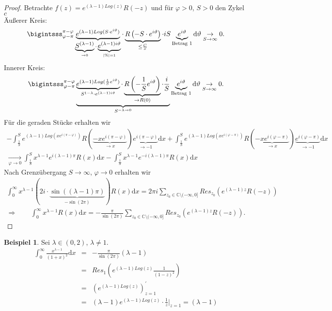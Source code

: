\documentclass[11pt,titlepage]{article}
\theoremstyle{definition}
\newtheorem{example}[theorem]{Beispiel}
\theoremstyle{remark}
\begin{document}
	\begin{proof}
		Betrachte $f(z)=e^{(\lambda -1)Log(z)}R(-z)$ und für $\varphi >0$, $S>0$ den Zykel $c$ \\
		
		
		Äußerer Kreis:
		\[ \bigintsss_{\varphi-\pi}^{\pi-\varphi}\underbrace{e^{(\lambda -1)Log(S\cdot e^{i\vartheta})}}_
		{\underbrace{S^{(\lambda -1)}}_{\to 0} \cdot \underbrace{ e^{(\lambda -1)i\vartheta}}_{|\%|=1}}
		\cdot \underbrace{ R\left( -S\cdot e^{i\vartheta}\right)}_{\leq \frac{C}{S}}\cdot 
		iS\underbrace{e^{i\vartheta}}_
		{\text{Betrag $1$}}\mathrm{d}\vartheta \underset{S\to\infty}{\to}0.\]
		Innerer Kreis:
		\[ \bigintsss_{\varphi-\pi}^{\pi-\varphi} \underbrace{\underbrace{e^{(\lambda -1)Log(\frac{1}{S}
		e^{i\vartheta})}}_
		{S^{1-\lambda}\cdot e^{(\lambda -1)i\vartheta}}\cdot \underbrace{R\left(-\frac{1}{S}e^{i\vartheta}\right)}_
		{\to R(0)} \cdot \frac{i}{S}}_{S^{-\lambda\to0}}\underbrace{e^{i\vartheta}}_{\text{Betrag $1$}}\mathrm{d}
		\vartheta \underset{S\to\infty}{\to}0. \]
		Für die geraden Stücke erhalten wir
		\begin{eqnarray*}
			-\int_{\frac{1}{S}}^S e^{(\lambda -1)Log(xe^{i(\pi-\varphi)})}R(\underbrace{-xe^{i(\pi-\varphi)}}_
			{\to x})\underbrace{e^{i(\pi-\varphi)}}_{\to -1}\mathrm{d}x
			+ \int_{\frac{1}{S}}^S e^{(\lambda -1)Log(xe^{i(\varphi-\pi)})}R(\underbrace{-xe^{i(\varphi-\pi)}}_
			{\to x})\underbrace{e^{i(\varphi-\pi)}}_{\to -1}\mathrm{d}x \\
			\xrightarrow[\varphi\to0]{} \int_{\frac{1}{S}}^S x^{\lambda -1}e^{i(\lambda -1)\pi}R(x)\mathrm{d}x
			-\int_{\frac{1}{S}}^S x^{\lambda -1}e^{-i(\lambda -1)\pi}R(x)\mathrm{d}x
		\end{eqnarray*}
		Nach Grenzübergang $S\to\infty$, $\varphi\to0$ erhalten wir
		\begin{eqnarray*}
			\int_0^{\infty} x^{\lambda -1}(2i\cdot \underbrace{\sin((\lambda -1)\pi)}_{-\sin(2\pi)})R(x)\mathrm{d}x
			= 2\pi i\sum_{z_0\in\mathbb{C}\setminus (-\infty,0]}Res_{z_0}(e^{(\lambda -1)z}R(-z)) \\
			\Rightarrow \qquad \int_0^{\infty} x^{\lambda -1}R(x)\mathrm{d}x
			=-\frac{\pi}{\sin(2\pi)}\sum_{z_0\in\mathbb{C}\setminus (-\infty,0]} 
			Res_{z_0}(e^{(\lambda -1)z}R(-z)).
		\end{eqnarray*}
	\end{proof}
	
	\begin{example}
		Sei $\lambda\in (0,2)$, $\lambda\neq 1$.
		\begin{eqnarray*} 
			\int_0^{\infty} \frac{x^{\lambda -1}}{(1+x)^2}\mathrm{d}x &=& -\frac{\pi}{\sin(2\pi)}(\lambda -1) \\
			&=& Res_1 \left( e^{(\lambda -1)Log(z)}\frac{1}{(1-z)^2}\right) \\
			&=& \left( e^{(\lambda -1)Log(z)}\right)_{z=1}^{'} \\
			&=& (\lambda -1)e^{(\lambda -1)Log(z)} \cdot \frac{1}{z}\vert_{z=1} =(\lambda -1)
		\end{eqnarray*}
	\end{example}
		
\end{document}
